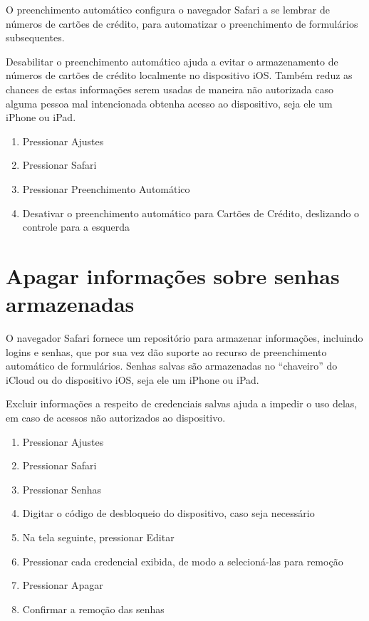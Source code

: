 O preenchimento autom\'atico configura o navegador Safari a se lembrar de n\'umeros de cart\~oes de cr\'edito, para automatizar o preenchimento de formul\'arios subsequentes.

Desabilitar o preenchimento autom\'atico ajuda a evitar o armazenamento de n\'umeros de cart\~oes de cr\'edito localmente no dispositivo iOS. Tamb\'em reduz as chances de estas informa\c c\~oes serem usadas de maneira n\~ao autorizada caso alguma pessoa mal intencionada obtenha acesso ao dispositivo, seja ele um iPhone ou iPad. 

\begin{enumerate}
\item Pressionar Ajustes
\item Pressionar Safari
\item Pressionar Preenchimento Autom\'atico
\item Desativar o preenchimento autom\'atico para Cart\~oes de Cr\'edito, deslizando o controle para a esquerda
\end{enumerate}

\section{Apagar informa\c c\~oes sobre senhas armazenadas}

O navegador Safari fornece um reposit\'orio para armazenar informa\c c\~oes, incluindo logins e senhas, que por sua vez d\~ao suporte ao recurso de  preenchimento autom\'atico de formul\'arios. Senhas salvas s\~ao armazenadas no ``chaveiro'' do iCloud ou do dispositivo iOS, seja ele um iPhone ou iPad. 

Excluir informa\c c\~oes a respeito de credenciais salvas ajuda a impedir o uso delas, em caso de acessos n\~ao autorizados ao dispositivo.

\begin{enumerate}
\item Pressionar Ajustes
\item Pressionar Safari
\item Pressionar Senhas
\item Digitar o c\'odigo de desbloqueio do dispositivo, caso seja necess\'ario
\item Na tela seguinte, pressionar Editar
\item Pressionar cada credencial exibida, de modo a selecion\'a-las para remo\c c\~ao
\item Pressionar Apagar
\item Confirmar a remo\c c\~ao das senhas 
\end{enumerate}

